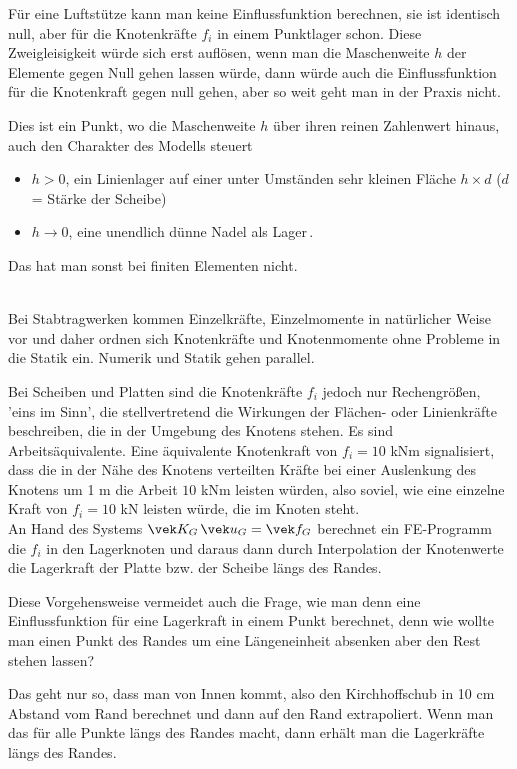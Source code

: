 {F\"{u}r eine Luftst\"{u}tze kann man keine Einflussfunktion berechnen, sie ist identisch null, aber f\"{u}r die Knotenkr\"{a}fte $f_i$ in einem Punktlager schon. Diese Zweigleisigkeit w\"{u}rde sich erst aufl\"{o}sen, wenn man die Maschenweite $h$ der Elemente gegen Null gehen lassen w\"{u}rde, dann w\"{u}rde auch die Einflussfunktion f\"{u}r die Knotenkraft gegen null gehen, aber so weit geht man in der Praxis nicht.

Dies ist ein Punkt, wo die Maschenweite $h$ \"{u}ber ihren reinen Zahlenwert hinaus, auch den Charakter des Modells steuert
\begin{itemize}
  \item $h > 0$, ein Linienlager auf einer unter Umst\"{a}nden sehr kleinen Fl\"{a}che $h \times d$ ($d$ = St\"{a}rke der Scheibe)
  \item $h \to 0$, eine unendlich d\"{u}nne Nadel als Lager\,.
\end{itemize}
Das hat man sonst bei finiten Elementen nicht.

\\

Bei Stabtragwerken kommen Einzelkr\"{a}fte, Einzelmomente in nat\"{u}rlicher Weise vor und daher ordnen sich Knotenkr\"{a}fte und Knotenmomente ohne Probleme in die Statik ein. Numerik und Statik gehen parallel.

Bei Scheiben und Platten sind die Knotenkr\"{a}fte $f_i$ jedoch nur Rechengr\"{o}{\ss}en, 'eins im Sinn', die stellvertretend die Wirkungen der Fl\"{a}chen- oder Linienkr\"{a}fte beschreiben, die in der Umgebung des Knotens stehen. Es sind Arbeits\"{a}quivalente. Eine \"{a}quivalente Knotenkraft von $f_i = 10$ kNm signalisiert, dass die in der N\"{a}he des Knotens verteilten Kr\"{a}fte bei einer Auslenkung des Knotens um 1 m die Arbeit $10$ kNm leisten w\"{u}rden, also soviel, wie eine einzelne Kraft von $f_i = 10$ kN leisten w\"{u}rde, die im Knoten steht.
\\

An Hand des Systems $\vek K_{G}\,\vek u_{G} = \vek f_{G}$ berechnet ein FE-Programm die $f_i$ in den Lagerknoten und daraus dann durch Interpolation der Knotenwerte die Lagerkraft der Platte bzw. der Scheibe l\"{a}ngs des Randes.

Diese Vorgehensweise vermeidet auch die Frage, wie man denn eine Einflussfunktion f\"{u}r eine Lagerkraft in einem Punkt berechnet, denn wie wollte man einen Punkt des Randes um eine L\"{a}ngeneinheit absenken aber den Rest stehen lassen?

Das geht nur so, dass man von Innen kommt, also den Kirchhoffschub in 10 cm Abstand vom Rand berechnet und dann auf den  Rand extrapoliert. Wenn man das f\"{u}r alle Punkte l\"{a}ngs des Randes macht, dann erh\"{a}lt man die Lagerkr\"{a}fte l\"{a}ngs des Randes.

}
